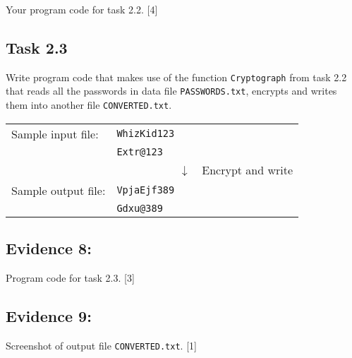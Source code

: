 Your program code for task 2.2.\hfill{} {[}4{]}

\subsection*{Task 2.3 }

Write program code that makes use of the function \texttt{Cryptograph}
from task 2.2 that reads all the passwords in data file \texttt{PASSWORDS.txt},
encrypts and writes them into another file \texttt{CONVERTED.txt}. 

\begin{tabular}{l|l|l}
\cline{2-2} 
Sample input file:  & \texttt{WhizKid123 } & \tabularnewline
 & \texttt{Extr@123} & \tabularnewline
\cline{2-2} 
\multicolumn{1}{l}{} & \multicolumn{1}{l}{~~~~~~~~~~~$\downarrow$} & Encrypt and write\tabularnewline
\cline{2-2} 
Sample output file: & \texttt{VpjaEjf389} & \tabularnewline
 & \texttt{Gdxu@389} & \tabularnewline
\cline{2-2} 
\end{tabular}

\subsection*{Evidence 8: }

Program code for task 2.3. \hfill{}{[}3{]}

\subsection*{Evidence 9: }

Screenshot of output file \texttt{CONVERTED.txt}. \hfill{}{[}1{]}